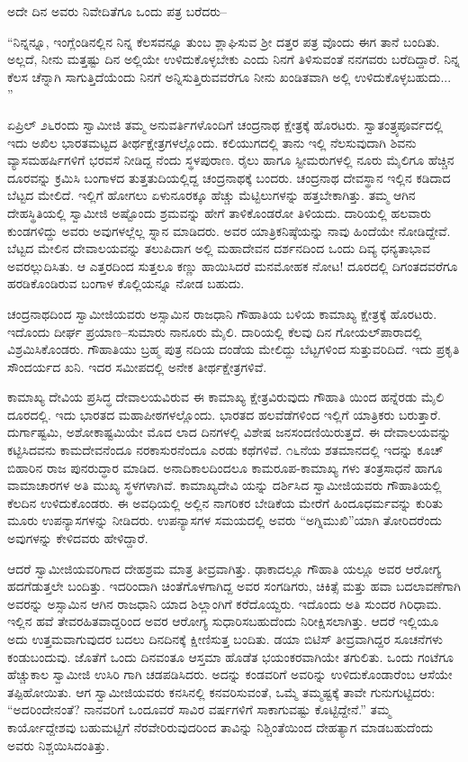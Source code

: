 ಅದೇ ದಿನ ಅವರು ನಿವೇದಿತೆಗೂ ಒಂದು ಪತ್ರ ಬರೆದರು–

“ನಿನ್ನನ್ನೂ, ಇಂಗ್ಲೆಂಡಿನಲ್ಲಿನ ನಿನ್ನ ಕೆಲಸವನ್ನೂ ತುಂಬ ಶ್ಲಾಘಿಸುವ ಶ್ರೀ ದತ್ತರ ಪತ್ರ ವೊಂದು ಈಗ ತಾನೆ ಬಂದಿತು. ಅಲ್ಲದೆ, ನೀನು ಮತ್ತಷ್ಟು ದಿನ ಅಲ್ಲಿಯೇ ಉಳಿದುಕೊಳ್ಳಬೇಕು ಎಂದು ನಿನಗೆ ತಿಳಿಸುವಂತೆ ನನಗವರು ಬರೆದಿದ್ದಾರೆ. ನಿನ್ನ ಕೆಲಸ ಚೆನ್ನಾಗಿ ಸಾಗುತ್ತಿದೆಯೆಂದು ನಿನಗೆ ಅನ್ನಿಸುತ್ತಿರುವವರೆಗೂ ನೀನು ಖಂಡಿತವಾಗಿ ಅಲ್ಲಿ ಉಳಿದುಕೊಳ್ಳಬಹುದು... ”

ಏಪ್ರಿಲ್ ೨೬ರಂದು ಸ್ವಾಮೀಜಿ ತಮ್ಮ ಅನುವರ್ತಿಗಳೊಂದಿಗೆ ಚಂದ್ರನಾಥ ಕ್ಷೇತ್ರಕ್ಕೆ ಹೊರಟರು. ಸ್ವಾತಂತ್ರ್ಯಪೂರ್ವದಲ್ಲಿ ಇದು ಅಖಿಲ ಭಾರತಮಟ್ಟದ ತೀರ್ಥಕ್ಷೇತ್ರಗಳಲ್ಲೊಂದು. ಕಲಿಯುಗದಲ್ಲಿ ತಾನು ಇಲ್ಲಿ ನೆಲಸುವುದಾಗಿ ಶಿವನು ವ್ಯಾಸಮಹರ್ಷಿಗಳಿಗೆ ಭರವಸೆ ನೀಡಿದ್ದ ನೆಂದು ಸ್ಥಳಪುರಾಣ. ರೈಲು ಹಾಗೂ ಸ್ಟೀಮರುಗಳಲ್ಲಿ ನೂರು ಮೈಲಿಗೂ ಹೆಚ್ಚಿನ ದೂರವನ್ನು ಕ್ರಮಿಸಿ ಬಂಗಾಳದ ತುತ್ತತುದಿಯಲ್ಲಿದ್ದ ಚಂದ್ರನಾಥಕ್ಕೆ ಬಂದರು. ಚಂದ್ರನಾಥ ದೇವಸ್ಥಾನ ಇಲ್ಲಿನ ಕಡಿದಾದ ಬೆಟ್ಟದ ಮೇಲಿದೆ. ಇಲ್ಲಿಗೆ ಹೋಗಲು ಏಳುನೂರಕ್ಕೂ ಹೆಚ್ಚು ಮೆಟ್ಟಿಲುಗಳನ್ನು ಹತ್ತಬೇಕಾಗಿತ್ತು. ತಮ್ಮ ಆಗಿನ ದೇಹಸ್ಥಿತಿಯಲ್ಲಿ ಸ್ವಾಮೀಜಿ ಅಷ್ಟೊಂದು ಶ್ರಮವನ್ನು ಹೇಗೆ ತಾಳಿಕೊಂಡರೋ ತಿಳಿಯದು. ದಾರಿಯಲ್ಲಿ ಹಲವಾರು ಕುಂಡಗಳಿದ್ದು ಅವರು ಅವುಗಳಲ್ಲೆಲ್ಲ ಸ್ನಾನ ಮಾಡಿದರು. ಅವರ ಯಾತ್ರಿಕನಿಷ್ಠೆಯನ್ನು ನಾವು ಹಿಂದೆಯೇ ನೋಡಿದ್ದೇವೆ. ಬೆಟ್ಟದ ಮೇಲಿನ ದೇವಾಲಯವನ್ನು ತಲುಪಿದಾಗ ಅಲ್ಲಿ ಮಹಾದೇವನ ದರ್ಶನದಿಂದ ಒಂದು ದಿವ್ಯ ಧನ್ಯತಾಭಾವ ಅವರಲ್ಲುದಿಸಿತು. ಆ ಎತ್ತರದಿಂದ ಸುತ್ತಲೂ ಕಣ್ಣು ಹಾಯಿಸಿದರೆ ಮನಮೋಹಕ ನೋಟ! ದೂರದಲ್ಲಿ ದಿಗಂತದವರೆಗೂ ಹರಡಿಕೊಂಡಿರುವ ಬಂಗಾಳ ಕೊಲ್ಲಿಯನ್ನೂ ನೋಡ ಬಹುದು.

ಚಂದ್ರನಾಥದಿಂದ ಸ್ವಾಮೀಜಿಯವರು ಅಸ್ಸಾಮಿನ ರಾಜಧಾನಿ ಗೌಹಾತಿಯ ಬಳಿಯ ಕಾಮಾಖ್ಯ ಕ್ಷೇತ್ರಕ್ಕೆ ಹೊರಟರು. ಇದೊಂದು ದೀರ್ಘ ಪ್ರಯಾಣ–ಸುಮಾರು ನಾನೂರು ಮೈಲಿ. ದಾರಿಯಲ್ಲಿ ಕೆಲವು ದಿನ ಗೋಯಲ್​ಪಾರಾದಲ್ಲಿ ವಿಶ್ರಮಿಸಿಕೊಂಡರು. ಗೌಹಾತಿಯು ಬ್ರಹ್ಮ ಪುತ್ರ ನದಿಯ ದಂಡೆಯ ಮೇಲಿದ್ದು ಬೆಟ್ಟಗಳಿಂದ ಸುತ್ತುವರಿದಿದೆ. ಇದು ಪ್ರಕೃತಿ ಸೌಂದರ್ಯದ ಖನಿ. ಇದರ ಸಮೀಪದಲ್ಲಿ ಅನೇಕ ತೀರ್ಥಕ್ಷೇತ್ರಗಳಿವೆ.

ಕಾಮಾಖ್ಯ ದೇವಿಯ ಪ್ರಸಿದ್ಧ ದೇವಾಲಯವಿರುವ ಈ ಕಾಮಾಖ್ಯ ಕ್ಷೇತ್ರವಿರುವುದು ಗೌಹಾತಿ ಯಿಂದ ಹನ್ನೆರಡು ಮೈಲಿ ದೂರದಲ್ಲಿ. ಇದು ಭಾರತದ ಮಹಾಪೀಠಗಳಲ್ಲೊಂದು. ಭಾರತದ ಹಲವೆಡೆಗಳಿಂದ ಇಲ್ಲಿಗೆ ಯಾತ್ರಿಕರು ಬರುತ್ತಾರೆ. ದುರ್ಗಾಷ್ಟಮಿ, ಅಶೋಕಾಷ್ಟಮಿಯೇ ಮೊದ ಲಾದ ದಿನಗಳಲ್ಲಿ ವಿಶೇಷ ಜನಸಂದಣಿಯಿರುತ್ತದೆ. ಈ ದೇವಾಲಯವನ್ನು ಕಟ್ಟಿಸಿದವನು ಕಾಮದೇವನೆಂದೂ ನರಕಾಸುರನೆಂದೂ ಎರಡು ಕಥೆಗಳಿವೆ. ೧೬ನೆಯ ಶತಮಾನದಲ್ಲಿ ಇದನ್ನು ಕೂಚ್​ಬಿಹಾರಿನ ರಾಜ ಪುನರುದ್ಧಾರ ಮಾಡಿದ. ಅನಾದಿಕಾಲದಿಂದಲೂ ಕಾಮರೂಪ-ಕಾಮಾಖ್ಯ ಗಳು ತಂತ್ರಸಾಧನೆ ಹಾಗೂ ವಾಮಾಚಾರಗಳ ಅತಿ ಮುಖ್ಯ ಸ್ಥಳಗಳಾಗಿವೆ. ಕಾಮಾಖ್ಯದೇವಿ ಯನ್ನು ದರ್ಶಿಸಿದ ಸ್ವಾಮೀಜಿಯವರು ಗೌಹಾತಿಯಲ್ಲಿ ಕೆಲದಿನ ಉಳಿದುಕೊಂಡರು. ಈ ಅವಧಿಯಲ್ಲಿ ಅಲ್ಲಿನ ನಾಗರಿಕರ ಬೇಡಿಕೆಯ ಮೇರೆಗೆ ಹಿಂದೂಧರ್ಮವನ್ನು ಕುರಿತು ಮೂರು ಉಪನ್ಯಾಸಗಳನ್ನು ನೀಡಿದರು. ಉಪನ್ಯಾಸಗಳ ಸಮಯದಲ್ಲಿ ಅವರು “ಅಗ್ನಿಮುಖಿ”ಯಾಗಿ ತೋರಿದರೆಂದು ಅವುಗಳನ್ನು ಕೇಳಿದವರು ಹೇಳಿದ್ದಾರೆ.

ಆದರೆ ಸ್ವಾಮೀಜಿಯವರಿಗಾದ ದೇಹಶ್ರಮ ಮಾತ್ರ ತೀವ್ರವಾಗಿತ್ತು. ಢಾಕಾದಲ್ಲೂ ಗೌಹಾತಿ ಯಲ್ಲೂ ಅವರ ಆರೋಗ್ಯ ಹದಗೆಡುತ್ತಲೇ ಬಂದಿತ್ತು. ಇದರಿಂದಾಗಿ ಚಿಂತೆಗೊಳಗಾಗಿದ್ದ ಅವರ ಸಂಗಡಿಗರು, ಚಿಕಿತ್ಸೆ ಮತ್ತು ಹವಾ ಬದಲಾವಣೆಗಾಗಿ ಅವರನ್ನು ಅಸ್ಸಾಮಿನ ಆಗಿನ ರಾಜಧಾನಿ ಯಾದ ಶಿಲ್ಲಾಂಗಿಗೆ ಕರೆದೊಯ್ದರು. ಇದೊಂದು ಅತಿ ಸುಂದರ ಗಿರಿಧಾಮ. ಇಲ್ಲಿನ ಹವೆ ತೇವರಹಿತವಾದ್ದರಿಂದ ಅವರ ಆರೋಗ್ಯ ಸುಧಾರಿಸಬಹುದೆಂದು ನಿರೀಕ್ಷಿಸಲಾಗಿತ್ತು. ಆದರೆ ಇಲ್ಲಿಯೂ ಅದು ಉತ್ತಮವಾಗುವುದರ ಬದಲು ದಿನದಿನಕ್ಕೆ ಕ್ಷೀಣಿಸುತ್ತ ಬಂದಿತು. ಡಯಾ ಬಿಟಿಸ್ ತೀವ್ರವಾಗಿದ್ದರ ಸೂಚನೆಗಳು ಕಂಡುಬಂದುವು. ಜೊತೆಗೆ ಒಂದು ದಿನವಂತೂ ಆಸ್ತಮಾ ಹೊಡೆತ ಭಯಂಕರವಾಗಿಯೇ ತಗುಲಿತು. ಒಂದು ಗಂಟೆಗೂ ಹೆಚ್ಚುಕಾಲ ಸ್ವಾಮೀಜಿ ಉಸಿರಿ ಗಾಗಿ ಚಡಪಡಿಸಿದರು. ಅದನ್ನು ಕಂಡವರಿಗೆ ಅವರಿನ್ನು ಉಳಿದುಕೊಂಡಾರೆಂಬ ಆಸೆಯೇ ತಪ್ಪಿಹೋಯಿತು. ಆಗ ಸ್ವಾಮೀಜಿಯವರು ಕನಸಿನಲ್ಲಿ ಕನವರಿಸುವಂತೆ, ಒಮ್ಮೆ ತಮ್ಮಷ್ಟಕ್ಕೆ ತಾವೇ ಗುನುಗುಟ್ಟಿದರು: “ಅದರಿಂದೇನಂತೆ? ನಾನವರಿಗೆ ಒಂದೂವರೆ ಸಾವಿರ ವರ್ಷಗಳಿಗೆ ಸಾಕಾಗುವಷ್ಟು ಕೊಟ್ಟಿದ್ದೇನೆ.” ತಮ್ಮ ಕಾರ್ಯೋದ್ದೇಶವು ಬಹುಮಟ್ಟಿಗೆ ನೆರವೇರಿರುವುದರಿಂದ ತಾವಿನ್ನು ನಿಶ್ಚಿಂತೆಯಿಂದ ದೇಹತ್ಯಾಗ ಮಾಡಬಹುದೆಂದು ಅವರು ನಿಶ್ಚಯಿಸಿದಂತಿತ್ತು.

